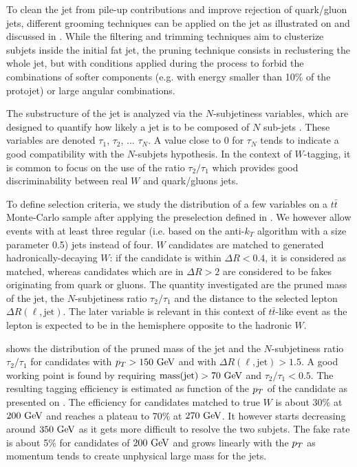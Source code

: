     To clean the jet from pile-up contributions and improve rejection of
    quark/gluon jets, different grooming techniques can be applied on the jet
    as illustrated on  and discussed in
    \cite{jetClusteringComparison, JME-13-006}.
    While the filtering and trimming techniques aim to clusterize subjets inside
    the initial fat jet, the pruning technique consists in reclustering the whole
    jet, but with conditions applied during the process to forbid the combinations
    of softer components (e.g. with energy smaller than 10\% of the protojet) or
    large angular combinations.

    The substructure of the jet is analyzed via the $N$-subjetiness variables,
    which are designed to quantify how likely a jet is to be composed of $N$
    sub-jets \cite{N-subjettiness}. These variables are denoted $\tau_1$,
    $\tau_2$, ... $\tau_N$. A value close to 0 for $\tau_N$ tends to indicate
    a good compatibility with the $N$-subjets hypothesis. In the context of
    $W$-tagging, it is common to focus on the use of the ratio $\tau_2/\tau_1$
    which provides good discriminability between real $W$ and quark/gluons jets.

    To define selection criteria, we study the distribution of a few variables
    on a $t\bar{t}$ Monte-Carlo sample after applying the preselection defined in
    . We however allow events with at
    least three regular (i.e. based on the anti-$k_T$ algorithm with a size parameter 0.5) jets
    instead of four. $W$ candidates are matched to generated
    hadronically-decaying $W$: if the candidate is within $\Delta R < 0.4$, it
    is considered as matched, whereas candidates which are in $\Delta R > 2$ are
    considered to be fakes originating from quark or gluons.
    The quantity investigated are the pruned mass of the jet, the $N$-subjetiness ratio
    $\tau_2 / \tau_1$ and the distance to the selected lepton $\Delta R (\ell,\text{jet})$.
    The later variable is relevant in this context of $t\bar{t}$-like event as the lepton
    is expected to be in the hemisphere opposite to the hadronic $W$.

     shows the distribution of the pruned mass of
    the jet and the $N$-subjetiness ratio $\tau_2 / \tau_1$ for candidates with
    $p_T > 150~\text{GeV}$ and with $\Delta R(\ell,\text{jet}) > 1.5$. A good working point
    is found by requiring $\text{mass}(\text{jet}) > 70~\text{GeV}$ and $\tau_2 / \tau_1 < 0.5$.
    The resulting tagging efficiency is estimated as function of the $p_T$ of the
    candidate as presented on .
    The efficiency for candidates matched
    to true $W$ is about 30\% at $200~\text{GeV}$ and reaches a plateau to 70\% at $270~\text{GeV}$. It
    however starts decreasing around $350~\text{GeV}$ as it gets more difficult to resolve
    the two subjets. The fake rate is about 5\% for candidates of $200~\text{GeV}$ and
    grows linearly with the $p_T$ as momentum tends to create unphysical large
    mass for the jets.

